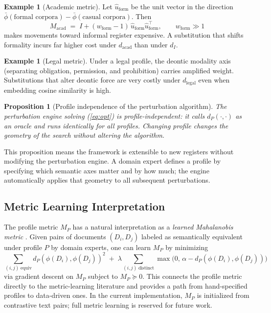\documentclass[12pt, a4paper]{article}
\theoremstyle{plain}
\newtheorem{proposition}[theorem]{Proposition}
\theoremstyle{definition}
\newtheorem{example}[theorem]{Example}
\theoremstyle{remark}
\begin{document}
\begin{example}[Academic metric]
Let $\hat{u}_{\mathrm{form}}$ be the unit vector in the direction
$\bar\phi(\text{formal corpora}) - \bar\phi(\text{casual corpora})$.  Then
\[
   M_{\mathrm{acad}} \;=\; I + (w_{\mathrm{form}} - 1)\,
   \hat{u}_{\mathrm{form}} \hat{u}_{\mathrm{form}}^\top, \qquad
   w_{\mathrm{form}} \gg 1
\]
makes movements toward informal register expensive.  A substitution that shifts
formality incurs far higher cost under $d_{\mathrm{acad}}$ than under $d_I$.
\end{example}

\begin{example}[Legal metric]
Under a legal profile, the deontic modality axis (separating obligation,
permission, and prohibition) carries amplified weight.  Substitutions that
alter deontic force are very costly under $d_{\mathrm{legal}}$ even when
embedding cosine similarity is high.
\end{example}

\begin{proposition}[Profile independence of the perturbation algorithm]
\label{prop:profile_independence}
The perturbation engine solving (\ref{eq:opt}) is profile-independent:
it calls $d_P(\cdot, \cdot)$ as an oracle and runs identically for all
profiles.  Changing profile changes the geometry of the search without
altering the algorithm.
\end{proposition}

This proposition means the framework is extensible to new registers without
modifying the perturbation engine.  A domain expert defines a profile by
specifying which semantic axes matter and by how much; the engine automatically
applies that geometry to all subsequent perturbations.

\subsection{Metric Learning Interpretation}

The profile metric $M_P$ has a natural interpretation as a \emph{learned
Mahalanobis metric} \cite{amari2016information}.  Given pairs of documents
$(D_i, D_j)$ labeled as semantically equivalent under profile $P$ by domain
experts, one can learn $M_P$ by minimizing
\[
   \sum_{(i,j)\;\text{equiv}} d_P(\phi(D_i), \phi(D_j))^2
   \;+\; \lambda \sum_{(i,j)\;\text{distinct}} \max\!\bigl(0,\, \alpha - d_P(\phi(D_i), \phi(D_j))\bigr)
\]
via gradient descent on $M_P$ subject to $M_P \succeq 0$.  This connects the
profile metric directly to the metric-learning literature
\cite{larsen2016autoencoding} and provides a path from hand-specified profiles
to data-driven ones.  In the current implementation, $M_P$ is initialized from
contrastive text pairs; full metric learning is reserved for future work.
\end{document}
